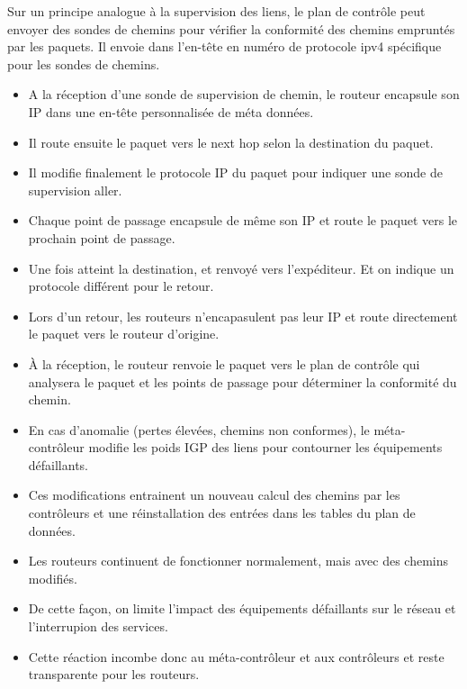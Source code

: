 \documentclass[12pt,a4paper]{report}
\begin{document}
        \begin{card}
            Sur un principe analogue à la supervision des liens, 
            le plan de contrôle peut envoyer des sondes de chemins pour vérifier la conformité des chemins empruntés par les paquets.
            Il envoie dans l'en-tête en numéro de protocole ipv4 spécifique pour les sondes de chemins.
            \begin{itemize}[left=0pt]
                \item A la réception d'une sonde de supervision de chemin, le routeur encapsule son IP dans une en-tête personnalisée de méta données.
                \item Il route ensuite le paquet vers le next hop selon la destination du paquet.
                \item Il modifie finalement le protocole IP du paquet pour indiquer une sonde de supervision aller.
                \item Chaque point de passage encapsule de même son IP et route le paquet vers le prochain point de passage.
                \item Une fois atteint la destination, et renvoyé vers l'expéditeur. Et on indique un protocole différent pour le retour.
                \item Lors d'un retour, les routeurs n'encapasulent pas leur IP et route directement le paquet vers le routeur d'origine.
                \item À la réception, le routeur renvoie le paquet vers le plan de contrôle qui analysera le paquet et les points de passage pour déterminer la conformité du chemin.
            \end{itemize}
        \end{card}

        \begin{card}
        \begin{itemize}[left=0pt]
            \item En cas d'anomalie (pertes élevées, chemins non conformes), le méta-contrôleur modifie les poids IGP des liens pour contourner les équipements défaillants.
            \item Ces modifications entrainent un nouveau calcul des chemins par les contrôleurs et une réinstallation des entrées dans les tables du plan de données.
            \item Les routeurs continuent de fonctionner normalement, mais avec des chemins modifiés.
            \item De cette façon, on limite l'impact des équipements défaillants sur le réseau et l'interrupion des services.
            \item Cette réaction incombe donc au méta-contrôleur et aux contrôleurs et reste transparente pour les routeurs.
        \end{itemize}
        \end{card}
\end{document}
